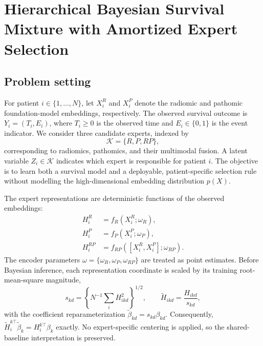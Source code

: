 
\section{Hierarchical Bayesian Survival Mixture with Amortized Expert Selection}
\label{sec:strategy7}

\subsection{Problem setting}

For patient $i\in\{1,\ldots,N\}$, let $X_i^R$ and $X_i^P$ denote the
radiomic and pathomic foundation-model embeddings, respectively. The observed
survival outcome is $Y_i=(T_i,E_i)$, where $T_i\geq 0$ is the observed time and
$E_i\in\{0,1\}$ is the event indicator. We consider three candidate experts,
indexed by
\begin{equation}
    \mathcal{K}=\{R,P,RP\},
\end{equation}
corresponding to radiomics, pathomics, and their multimodal fusion. A latent
variable $Z_i\in\mathcal{K}$ indicates which expert is responsible for patient
$i$. The objective is to learn both a survival model and a deployable,
patient-specific selection rule without modelling the high-dimensional
embedding distribution $p(X)$.

The expert representations are deterministic functions of the observed
embeddings:
\begin{align}
    H_i^R &= f_R(X_i^R;\omega_R), \\
    H_i^P &= f_P(X_i^P;\omega_P), \\
    H_i^{RP} &= f_{RP}([X_i^R,X_i^P];\omega_{RP}).
\end{align}
The encoder parameters $\omega=\{\omega_R,\omega_P,\omega_{RP}\}$ are treated
as point estimates. Before Bayesian inference, each representation coordinate
is scaled by its training root-mean-square magnitude,
\begin{equation}
    s_{kd}=\left\{N^{-1}\sum_i H_{ikd}^2\right\}^{1/2},
    \qquad \widetilde H_{ikd}=\frac{H_{ikd}}{s_{kd}},
\end{equation}
with the coefficient reparameterization
$\widetilde\beta_{kd}=s_{kd}\beta_{kd}$. Consequently,
$\widetilde H_i^{k\top}\widetilde\beta_k=H_i^{k\top}\beta_k$ exactly. No
expert-specific centering is applied, so the shared-baseline interpretation is
preserved.

